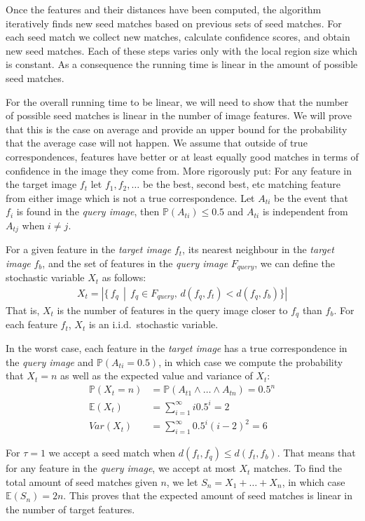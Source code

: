 \documentclass[runningheads]{llncs}
\begin{document}
Once the features and their distances have been computed, the algorithm iteratively finds new seed matches based on previous sets of seed matches. For each seed match we collect new matches, calculate confidence scores, and obtain new seed matches. Each of these steps varies only with the local region size which is constant. As a consequence the running time is linear in the amount of possible seed matches.

For the overall running time to be linear, we will need to show that the
number of possible seed matches is linear in the number of image
features. We will prove that this is the case on average and provide an
upper bound for the probability that the average case will not happen. We assume that outside of true correspondences, features have better or at least equally good matches in terms of confidence in the image they come from. More rigorously put: For any feature in the target image $f_t$ let $f_1, f_2, \ldots$ be the best, second best, etc matching feature from either image which is not a true correspondence. Let $A_{ti}$ be the event that $f_i$ is found in the \emph{query image}, then $\mathbb{P}(A_{ti}) \leq 0.5$ and $A_{ti}$ is independent from $A_{tj}$ when $i \ne j$.

For a given feature in the \emph{target image} $f_t$, its nearest neighbour in the \emph{target image} $f_b$, and the set of features in the \emph{query image} $F_{query}$, we can define the stochastic variable $X_t$ as follows:
\begin{align}
    X_t = \left| \{ \, f_q \, \middle| \, f_q \in F_{query},\, d(f_q, f_t) < d(f_q, f_b) \} \right|
\end{align}
That is, $X_t$ is the number of features in the query image closer to $f_q$ than $f_b$. For each feature $f_t$, $X_t$ is an i.i.d.~stochastic variable. 

In the worst case, each feature in the \emph{target image} has a true
correspondence in the \emph{query image} and $\mathbb{P}(A_{ti} = 0.5)$,
in which case we compute the probability that $X_t = n$ as well as the
expected value and variance of $X_t$:
\begin{align}
    \mathbb{P}(X_t = n) &= \mathbb{P}(A_{t1} \wedge \ldots \wedge A_{tn}) = 0.5^n \\
    \mathbb{E}(X_t) &= \sum_{i=1}^\infty i0.5^i = 2 \\
    Var(X_t) &= \sum_{i=1}^\infty 0.5^i(i - 2)^2 = 6
\end{align}

For $\tau = 1$ we accept a seed match when $d(f_t, f_q) \leq d(f_t, f_b)$. That means that for any feature in the \emph{query image}, we accept at most $X_t$ matches. To find the total amount of seed matches given $n$, we let $S_n = X_1 + \ldots + X_n$, in which case $\mathbb{E}(S_n) = 2n$. This proves that the expected amount of seed matches is linear in the number of target features. 
\end{document}
